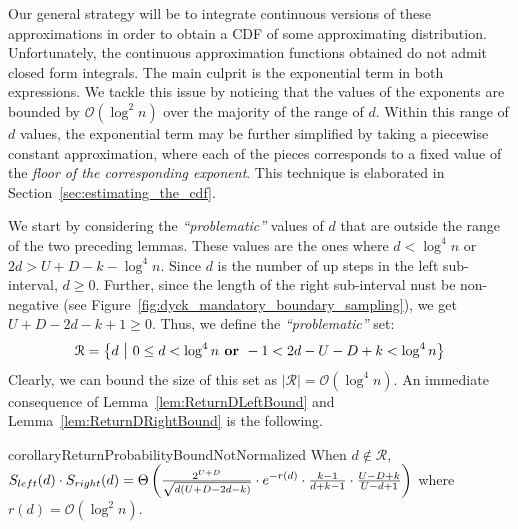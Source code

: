 Our general strategy will be to integrate continuous versions of these approximations in order to obtain a CDF of some approximating distribution.
Unfortunately, the continuous approximation functions obtained do not admit closed form integrals.
The main culprit is the exponential term in both expressions.
We tackle this issue by noticing that the values of the exponents are bounded by $\mathcal O(\log^2 n)$ over the majority of the range of $d$.
Within this range of $d$ values, the exponential term may be further simplified by taking a piecewise constant approximation,
where each of the pieces corresponds to a fixed value of the \emph{floor of the corresponding exponent}.
This technique is elaborated in Section~\ref{sec:estimating_the_cdf}.

We start by considering the \emph{``problematic''} values of $d$ that are outside the range of the two preceding lemmas.
These values are the ones where $d < \log^4 n$ or $2d > U+D-k-\log^4 n$.
Since $d$ is the number of up steps in the left sub-interval, $d \ge 0$.
Further, since the length of the right sub-interval nust be non-negative (see Figure~\ref{fig:dyck_mandatory_boundary_sampling}),
we get $U+D-2d-k+1 \ge 0$.
Thus, we define the \emph{``problematic''} set:
\begin{align}
\label{eq:SetDefinition}
    \mathcal R = \left\{ d\ \mathlarger|\ 0\le d < \log^4 n \textrm{\textbf{\ or\ }} -1 < 2d-U-D+k < \log^4 n \right\}
\end{align}
Clearly, we can bound the size of this set as $|\mathcal R| = \mathcal O(\log^4 n)$.
An immediate consequence of Lemma~\ref{lem:ReturnDLeftBound} and Lemma~\ref{lem:ReturnDRightBound} is the following.

\begin{restatable}{corollary}{ReturnProbabilityBoundNotNormalized}
\label{cor:ReturnProbabilityBoundNotNormalized}
When $d\not \in \mathcal R$,
$S_{left}(d)\cdot S_{right}(d)
= \Theta\left( \frac{2^{U+D}}{\sqrt{d(U+D-2d-k)}}\cdot \mathlarger e^{-r(d)} \cdot \frac{k-1}{d+k-1}\cdot\frac{U-D+k}{U-d+1}\right)$
where $r(d)=\mathcal O(\log^2 n)$.
\end{restatable}



